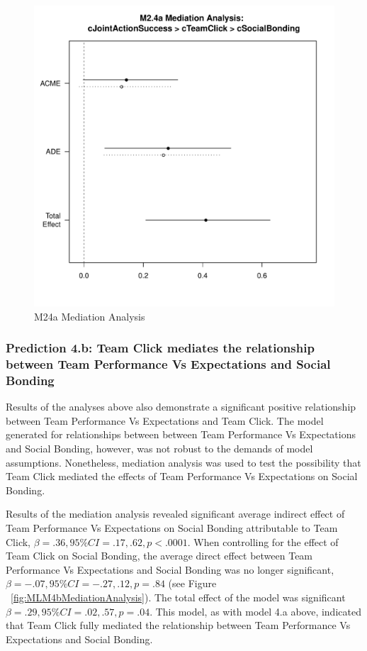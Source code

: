 \begin{CJK}{UTF8}{gbsn}
    \begin{figure}[htbp]
      \centering
      \includegraphics[scale=.5]{images/MLM24aMediationAnalysis.pdf}
      \caption{M24a Mediation Analysis}
      \label{fig:MLM24aMediationAnalysis}
    \end{figure}




\subsubsection{Prediction 4.b: Team Click mediates the relationship between Team Performance Vs Expectations and Social Bonding}

  Results of the analyses above also demonstrate a significant positive relationship between Team Performance Vs Expectations and Team Click. The model generated for relationships between between Team Performance Vs Expectations and Social Bonding, however, was not robust to the demands of model assumptions.   Nonetheless, mediation analysis was used to test the possibility that Team Click mediated the effects of Team Performance Vs Expectations on Social Bonding.

  Results of the mediation analysis revealed significant average indirect effect of Team Performance Vs Expectations on Social Bonding attributable to Team Click, $\beta = .36, 95\% CI = .17 , .62, p < .0001$.  When controlling for the effect of Team Click on Social Bonding, the average direct effect between Team Performance Vs Expectations and Social Bonding was no longer significant, $\beta = -.07, 95\% CI = -.27 , .12, p = .84 $ (see Figure ~\ref{fig:MLM4bMediationAnalysis}). The total effect of the model was significant $\beta = .29, 95\% CI = .02 , .57, p = .04$.  This model, as with model 4.a above, indicated that Team Click fully mediated the relationship between Team Performance Vs Expectations and Social Bonding.



\end{CJK}

